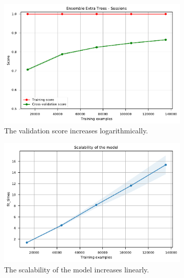 \documentclass{l4proj}
\begin{document}
\begin{appendices}
\begin{figure}[htbp]
    \centering
    \begin{subfigure}[b]{0.70\textwidth}
        \includegraphics[width=\textwidth]{images/sessions/learning_curve_1_EnsembleExtraTreesSessions.pdf}
        \caption{The validation score increases logarithmically.}
        \label{fig:learning_curve_1_EnsembleExtraTreesSessions}
    \end{subfigure}
    \begin{subfigure}[b]{0.70\textwidth}
        \includegraphics[width=\textwidth]{images/sessions/learning_curve_2_EnsembleExtraTreesSessions.pdf}
        \caption{The scalability of the model increases linearly.}
        \label{fig:learning_curve_2_EnsembleExtraTreesSessions}
    \end{subfigure}
    \begin{subfigure}[b]{0.70\textwidth}

\end{subfigure}
\end{figure}
\end{appendices}
\end{document}
